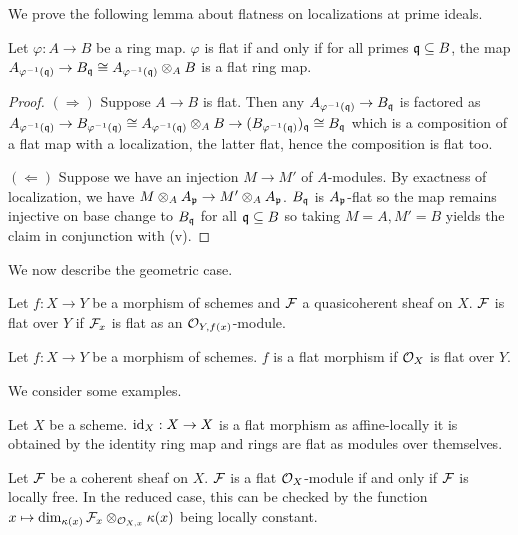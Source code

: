 We prove the following lemma about flatness on localizations at prime ideals. 
\begin{lemma}\label{lem: flatness on stalks}
    Let $\varphi:A\to B$ be a ring map. $\varphi$ is flat if and only if for all primes $\mathfrak{q}\subseteq B$, the map $A_{\varphi^{-1}(\mathfrak{q})}\to B_{\mathfrak{q}}\cong A_{\varphi^{-1}(\mathfrak{q})}\otimes_{A}B$ is a flat ring map. 
\end{lemma}
\begin{proof}
    $(\Rightarrow)$ Suppose $A\to B$ is flat. Then any $A_{\varphi^{-1}(\mathfrak{q})}\to B_{\mathfrak{q}}$ is factored as $A_{\varphi^{-1}(\mathfrak{q})}\to B_{\varphi^{-1}(\mathfrak{q})}\cong A_{\varphi^{-1}(\mathfrak{q})}\otimes_{A}B\to(B_{\varphi^{-1}(\mathfrak{q})})_{\mathfrak{q}}\cong B_{\mathfrak{q}}$ which is a composition of a flat map with a localization, the latter flat, hence the composition is flat too. 

    $(\Leftarrow)$ Suppose we have an injection $M\to M'$ of $A$-modules. By exactness of localization, we have $M\otimes_{A}A_{\mathfrak{p}}\to M'\otimes_{A}A_{\mathfrak{p}}$. $B_{\mathfrak{q}}$ is $A_{\mathfrak{p}}$-flat so the map remains injective on base change to $B_{\mathfrak{q}}$ for all $\mathfrak{q}\subseteq B$ so taking $M=A,M'=B$ yields the claim in conjunction with  (v). 
\end{proof}
We now describe the geometric case. 
\begin{definition}\label{def: flat sheaves}
    Let $f:X\to Y$ be a morphism of schemes and $\mathcal{F}$ a quasicoherent sheaf on $X$. $\mathcal{F}$ is flat over $Y$ if $\mathcal{F}_{x}$ is flat as an $\mathcal{O}_{Y,f(x)}$-module. 
\end{definition}
\begin{definition}\label{def: flat morphism}
    Let $f:X\to Y$ be a morphism of schemes. $f$ is a flat morphism if $\mathcal{O}_{X}$ is flat over $Y$. 
\end{definition}
We consider some examples. 
\begin{example}
    Let $X$ be a scheme. $\mathrm{id}_{X}:X\to X$ is a flat morphism as affine-locally it is obtained by the identity ring map and rings are flat as modules over themselves. 
\end{example}
\begin{example}\label{ex: local flatness}
    Let $\mathcal{F}$ be a coherent sheaf on $X$. $\mathcal{F}$ is a flat $\mathcal{O}_{X}$-module if and only if $\mathcal{F}$ is locally free. In the reduced case, this can be checked by the function $x\mapsto\dim_{\kappa(x)}\mathcal{F}_{x}\otimes_{\mathcal{O}_{X,x}}\kappa(x)$ being locally constant. 
\end{example}
